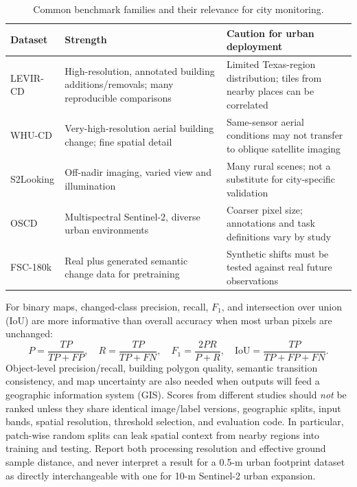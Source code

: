 \documentclass[11pt,a4paper]{article}
\newcommand{\tabhead}[1]{\textbf{#1}}
\begin{document}
\begin{table}[htbp]
\centering
\small
\caption{Common benchmark families and their relevance for city monitoring.}
\label{tab:data}
\begin{tabular}{@{}>{\raggedright\arraybackslash}p{}>{\raggedright\arraybackslash}p{}>{\raggedright\arraybackslash}p{}@{}}
\toprule
\tabhead{Dataset} & \tabhead{Strength} & \tabhead{Caution for urban deployment} \\
\midrule
LEVIR-CD \citep{ChenShi2020} & High-resolution, annotated building additions/removals; many reproducible comparisons & Limited Texas-region distribution; tiles from nearby places can be correlated \\
WHU-CD \citep{Ji2019} & Very-high-resolution aerial building change; fine spatial detail & Same-sensor aerial conditions may not transfer to oblique satellite imaging \\
S2Looking \citep{Shen2021} & Off-nadir imaging, varied view and illumination & Many rural scenes; not a substitute for city-specific validation \\
OSCD \citep{Basavaraju2022} & Multispectral Sentinel-2, diverse urban environments & Coarser pixel size; annotations and task definitions vary by study \\
FSC-180k \citep{Benidir2025} & Real plus generated semantic change data for pretraining & Synthetic shifts must be tested against real future observations \\
\bottomrule
\end{tabular}
\end{table}

For binary maps, changed-class precision, recall, $F_1$, and intersection over union (IoU) are more informative than overall accuracy when most urban pixels are unchanged:
\begin{equation}
 P=\frac{TP}{TP+FP},\quad R=\frac{TP}{TP+FN},\quad
 F_1=\frac{2PR}{P+R},\quad
 \mathrm{IoU}=\frac{TP}{TP+FP+FN}.
 \label{eq:metrics}
\end{equation}
Object-level precision/recall, building polygon quality, semantic transition consistency, and map uncertainty are also needed when outputs will feed a geographic information system (GIS). Scores from different studies should \emph{not} be ranked unless they share identical image/label versions, geographic splits, input bands, spatial resolution, threshold selection, and evaluation code. In particular, patch-wise random splits can leak spatial context from nearby regions into training and testing. Report both processing resolution and effective ground sample distance, and never interpret a result for a 0.5-m urban footprint dataset as directly interchangeable with one for 10-m Sentinel-2 urban expansion.
\end{document}
